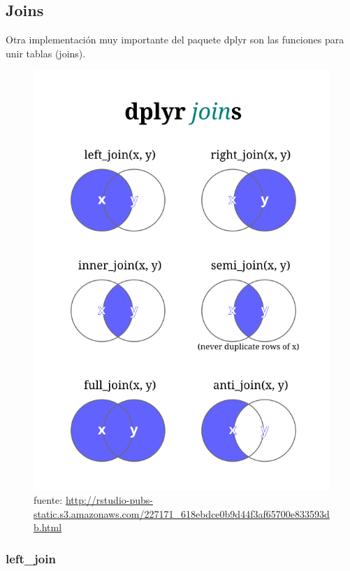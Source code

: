 \documentclass[]{book}
\begin{document}
\hypertarget{joins}{%
\subsection{Joins}\label{joins}}

Otra implementación muy importante del paquete dplyr son las funciones para unir tablas (joins).

\begin{figure}
\centering
\includegraphics{img/joins.png}
\caption{fuente: \url{http://rstudio-pubs-static.s3.amazonaws.com/227171_618ebdce0b9d44f3af65700e833593db.html}}
\end{figure}

\hypertarget{left_join}{%
\subsubsection{left\_join}\label{left_join}}
\end{document}
